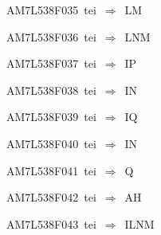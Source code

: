 {\sixrm AM7L538F035\ {\sixit tei}\ }$\Rightarrow$\ LM\par\smallskip
{\sixrm AM7L538F036\ {\sixit tei}\ }$\Rightarrow$\ LNM\par\smallskip
{\sixrm AM7L538F037\ {\sixit tei}\ }$\Rightarrow$\ IP\par\smallskip
{\sixrm AM7L538F038\ {\sixit tei}\ }$\Rightarrow$\ IN\par\smallskip
{\sixrm AM7L538F039\ {\sixit tei}\ }$\Rightarrow$\ IQ\par\smallskip
{\sixrm AM7L538F040\ {\sixit tei}\ }$\Rightarrow$\ IN\par\smallskip
{\sixrm AM7L538F041\ {\sixit tei}\ }$\Rightarrow$\ Q\par\smallskip
{\sixrm AM7L538F042\ {\sixit tei}\ }$\Rightarrow$\ AH\par\smallskip
{\sixrm AM7L538F043\ {\sixit tei}\ }$\Rightarrow$\ ILNM\par\smallskip

